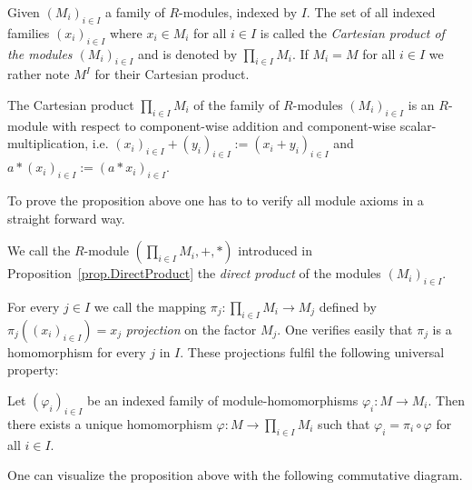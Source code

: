 Given $(M_i)_{i\in I}$ a family of $R$-modules, indexed by $I$. The set of all indexed families $(x_i)_{i\in I}$ where $x_i\in M_i$ for all $i\in I$ is called the \emph{Cartesian product of the modules $(M_i)_{i\in I}$} and is denoted by $\prod\limits_{i\in I} M_i$. If $M_i=M$ for all $i\in I$ we rather note $M^I$ for their Cartesian product.

\begin{pro}\label{prop.DirectProduct}
The Cartesian product $\prod_{i\in I} M_i$ of the family of $R$-modules $(M_i)_{i\in I}$ is an $R$-module with respect to component-wise addition and component-wise scalar-multiplication, i.e. $(x_i)_{i\in I}+(y_i)_{i\in I}:=(x_i+y_i)_{i\in I}$ and $a\ast(x_i)_{i\in I}:=(a\ast x_i)_{i\in I}$.
\end{pro}

To prove the proposition above one has to to verify all module axioms in a straight forward way.

\begin{defin}
We call the $R$-module $\left(\prod_{i\in I} M_i,+,\ast\right)$ introduced in Proposition~\ref{prop.DirectProduct} the \emph{direct product} of the modules $(M_i)_{i\in I}$.
\end{defin}

For every $j\in I$ we call the mapping $\pi_j\colon \prod_{i\in I} M_i\to M_j$ defined by $\pi_j((x_i)_{i\in I})=x_j$ \emph{projection} on the factor $M_j$. One verifies easily that $\pi_j$ is a homomorphism for every $j$ in $I$. These projections fulfil the following universal property:

\begin{pro}
Let $(\varphi_i)_{i\in I}$ be an indexed family of module-homomorphisms $\varphi_i\colon M\to M_i$. Then there exists a unique homomorphism $\varphi\colon M\to \prod_{i\in I} M_i$ such that $\varphi_i=\pi_i\circ\varphi$ for all $i\in I$.
\end{pro}

One can visualize the proposition above with the following commutative diagram.

\begin{center}
\end{center}

